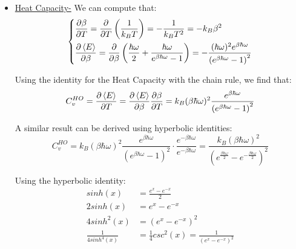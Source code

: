 \documentclass{article}
\numberwithin{equation}{subsection}
\begin{document}
\begin{enumerate}[label=\textbf{\Alph*.}]
\begin{itemize}
        \item \underline{Heat Capacity-} We can compute that:
        \begin{equation}
        \left\{
        \begin{aligned}
            &\frac{\partial \beta}{\partial T} = \frac{\partial}{\partial T} \left( \frac{1}{k_B T} \right) = -\frac{1}{k_B T^2} = -k_B \beta^2 \\
            &\frac{\partial \expval{E} }{\partial \beta} = \frac{\partial}{\partial \beta} \left(\frac{\hbar \omega}{2} +\frac{\hbar \omega}{e^{\beta \hbar \omega} -1} \right) = - \frac{(\hbar \omega)^2e^{\beta \hbar \omega} }{\left( e^{\beta \hbar \omega} - 1 \right)^2}
        \end{aligned}
        \right.
        \end{equation}
    
        Using the identity for the Heat Capacity with the chain rule, we find that:
        \begin{equation}
            C_v^{HO} = \frac{\partial \expval{E} }{\partial T} = \frac{\partial \expval{E} }{\partial \beta} \frac{\partial \beta}{\partial T} = k_B (\beta \hbar \omega)^2 \frac{e^{\beta \hbar \omega} }{ \left( e^{\beta \hbar \omega} - 1 \right)^2}
        \end{equation}
    
        A similar result can be derived using hyperbolic identities:
        \begin{equation}
            C_v^{HO} = k_B (\beta \hbar \omega)^2 \frac{e^{\beta \hbar \omega} }{ \left( e^{\beta \hbar \omega} - 1 \right)^2} \cdot \frac{e^{- \beta \hbar \omega} }{e^{- \beta \hbar \omega}} = \frac{k_B (\beta \hbar \omega)^2 } {\left( e^{\frac{\beta \hbar \omega}{2} } - e^{- \frac{\beta \hbar \omega}{2} } \right)^2 }
        \end{equation}
        
        Using the hyperbolic identity:   
        \begin{equation*}
        \begin{split}
            sinh(x) &= \frac{e^x-e^{-x} }{2} 
            \\
            2sinh(x) &= e^x-e^{-x} 
            \\
            4sinh^2(x) &= \left( e^x-e^{-x} \right)^2 
            \\
            \frac{1}{4sinh^4(x)} &= \frac{1}{4}csc^2(x)=\frac{1}{ \left( e^x -e^{-x} \right)^2 }
        \end{split}
        \end{equation*}
    

\end{itemize}
\end{enumerate}
\end{document}
